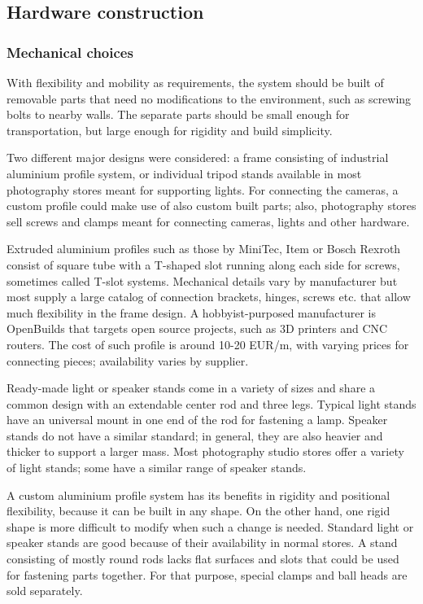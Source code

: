 
\subsection{Hardware construction} %

\subsubsection{Mechanical choices}

With flexibility and mobility as requirements, the system should be built of removable parts that need no modifications to the environment, such as screwing bolts to nearby walls.
The separate parts should be small enough for transportation, but large enough for rigidity and build simplicity.

Two different major designs were considered: a frame consisting of industrial aluminium profile system, or individual tripod stands available in most photography stores meant for supporting lights.
For connecting the cameras, a custom profile could make use of also custom built parts; also, photography stores sell screws and clamps meant for connecting cameras, lights and other hardware.

Extruded aluminium profiles such as those by MiniTec, Item or Bosch Rexroth consist of square tube with a T-shaped slot running along each side for screws, sometimes called T-slot systems.
Mechanical details vary by manufacturer but most supply a large catalog of connection brackets, hinges, screws etc. that allow much flexibility in the frame design.
A hobbyist-purposed manufacturer is OpenBuilds that targets open source projects, such as 3D printers and CNC routers.
The cost of such profile is around 10-20 EUR/m, with varying prices for connecting pieces; availability varies by supplier.

Ready-made light or speaker stands come in a variety of sizes and share a common design with an extendable center rod and three legs.
Typical light stands have an universal mount in one end of the rod for fastening a lamp.
Speaker stands do not have a similar standard; in general, they are also heavier and thicker to support a larger mass.
Most photography studio stores offer a variety of light stands; some have a similar range of speaker stands.

A custom aluminium profile system has its benefits in rigidity and positional flexibility, because it can be built in any shape.
On the other hand, one rigid shape is more difficult to modify when such a change is needed.
Standard light or speaker stands are good because of their availability in normal stores.
A stand consisting of mostly round rods lacks flat surfaces and slots that could be used for fastening parts together.
For that purpose, special clamps and ball heads are sold separately.

